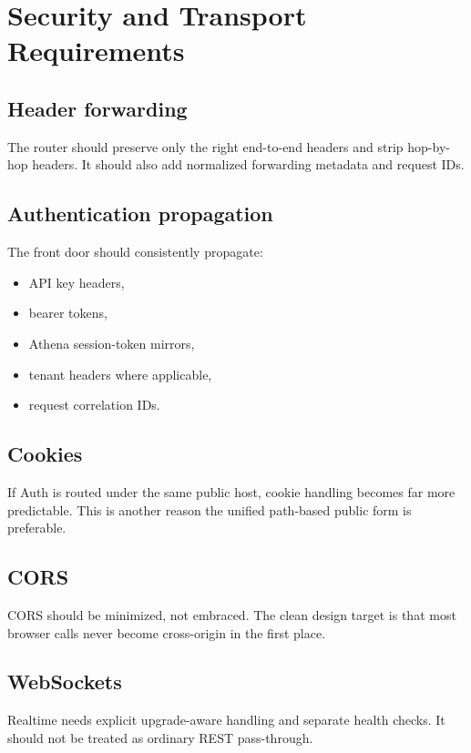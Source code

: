 \documentclass[11pt]{article}
\begin{document}
\section{Security and Transport Requirements}

\subsection{Header forwarding}

The router should preserve only the right end-to-end headers and strip hop-by-hop headers. It should also add normalized forwarding metadata and request IDs.

\subsection{Authentication propagation}

The front door should consistently propagate:

\begin{itemize}[leftmargin=1.5em]
  \item API key headers,
  \item bearer tokens,
  \item Athena session-token mirrors,
  \item tenant headers where applicable,
  \item request correlation IDs.
\end{itemize}

\subsection{Cookies}

If Auth is routed under the same public host, cookie handling becomes far more predictable. This is another reason the unified path-based public form is preferable.

\subsection{CORS}

CORS should be minimized, not embraced. The clean design target is that most browser calls never become cross-origin in the first place.

\subsection{WebSockets}

Realtime needs explicit upgrade-aware handling and separate health checks. It should not be treated as ordinary REST pass-through.
\end{document}
